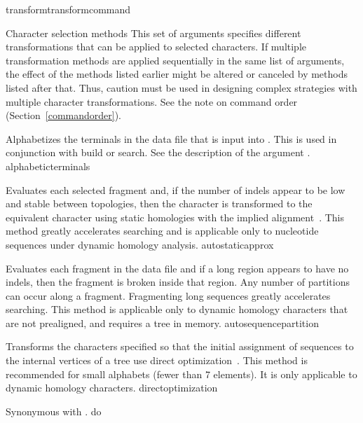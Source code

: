 \begin{command}{transform}{transformcommand}
\begin{arguments}
\begin{argumentgroup}{Character selection methods}
This set of arguments specifies different transformations that can be applied
to selected characters. If multiple transformation methods are applied
sequentially in the same list of arguments, the effect of the methods listed
earlier might be altered or canceled by methods listed after that. Thus, caution
must be used in designing complex strategies with multiple character
transformations. See the note on command order (Section~\ref{commandorder}).

{Alphabetizes the terminals in the data file that is input into \poy. This is used in 
conjunction with build or search. See the description of the argument 
.}
{alphabeticterminals}

{Evaluates each selected fragment and, if the number of indels
appear to be low and stable between topologies, then the character
is transformed to the equivalent character using static homologies
with the implied alignment~\cite{wheeler2003}.
This method greatly accelerates searching and is applicable only to 
nucleotide sequences under dynamic homology analysis.}
{autostaticapprox}

{Evaluates each fragment in the data file and if a long region appears 
to have no indels, then the fragment is broken inside that region.
Any number of partitions can occur along a fragment. Fragmenting
long sequences greatly accelerates searching. This method is
applicable only to dynamic homology characters that are not prealigned, 
and requires a tree in memory.}
{autosequencepartition}

{Transforms the characters specified so that the initial assignment of sequences to 
the internal vertices of a tree use direct
optimization~\cite{wheeler1996}. This method is recommended for small
alphabets (fewer than 7 elements). It is only applicable to dynamic homology
characters.}
{directoptimization}

{Synonymous with .}
{do}


\end{argumentgroup}
\end{arguments}
\end{command}
